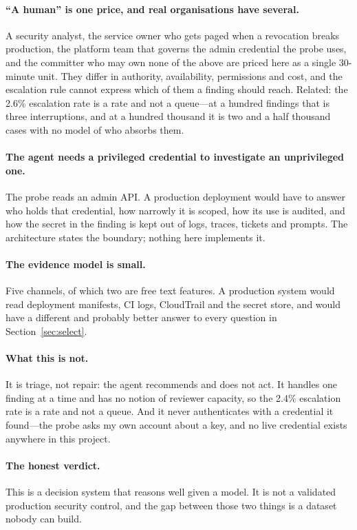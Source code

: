 \documentclass{article}
\begin{document}
\paragraph{``A human'' is one price, and real organisations have several.} A
security analyst, the service owner who gets paged when a revocation breaks
production, the platform team that governs the admin credential the probe uses,
and the committer who may own none of the above are priced here as a single
30-minute unit. They differ in authority, availability, permissions and cost, and
the escalation rule cannot express which of them a finding should reach. Related:
the 2.6\% escalation rate is a rate and not a queue---at a hundred findings that
is three interruptions, and at a hundred thousand it is two and a half thousand
cases with no model of who absorbs them.

\paragraph{The agent needs a privileged credential to investigate an
unprivileged one.} The probe reads an admin API. A production deployment would
have to answer who holds that credential, how narrowly it is scoped, how its use
is audited, and how the secret in the finding is kept out of logs, traces, tickets
and prompts. The architecture states the boundary; nothing here implements it.

\paragraph{The evidence model is small.} Five channels, of which two are free
text features. A production system would read deployment manifests, CI logs,
CloudTrail and the secret store, and would have a different and probably better
answer to every question in Section~\ref{sec:select}.

\paragraph{What this is not.} It is triage, not repair: the agent recommends and
does not act. It handles one finding at a time and has no notion of reviewer
capacity, so the 2.4\% escalation rate is a rate and not a queue. And it never
authenticates with a credential it found---the probe asks my own account about a
key, and no live credential exists anywhere in this project.

\paragraph{The honest verdict.} This is a decision system that reasons well given
a model. It is not a validated production security control, and the gap between
those two things is a dataset nobody can build.
\end{document}
